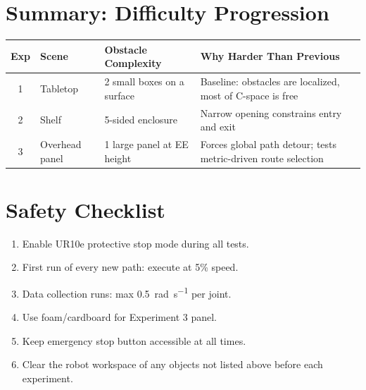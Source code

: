 \documentclass[11pt]{article}
\begin{document}
\newpage
\section{Summary: Difficulty Progression}

\begin{table}[h]
\centering
\begin{tabular}{@{}clll@{}}
\toprule
Exp & Scene & Obstacle Complexity & Why Harder Than Previous \\
\midrule
1 & Tabletop     & 2 small boxes on a surface & Baseline: obstacles are localized, most of C-space is free \\
2 & Shelf        & 5-sided enclosure       & Narrow opening constrains entry and exit \\
3 & Overhead panel & 1 large panel at EE height & Forces global path detour; tests metric-driven route selection \\
\bottomrule
\end{tabular}
\end{table}

\section{Safety Checklist}

\begin{enumerate}[itemsep=2pt]
  \item Enable UR10e protective stop mode during all tests.
  \item First run of every new path: execute at 5\% speed.
  \item Data collection runs: max \SI{0.5}{\radian\per\second} per joint.
  \item Use foam/cardboard for Experiment 3 panel.
  \item Keep emergency stop button accessible at all times.
  \item Clear the robot workspace of any objects not listed above before each experiment.
\end{enumerate}
\end{document}
